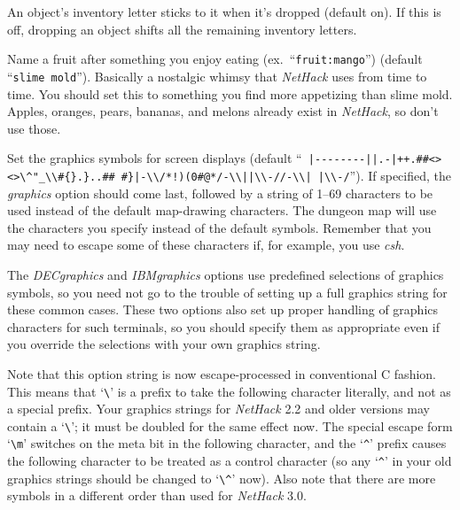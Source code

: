 \item[\ib{fixinv}]
An object's inventory letter sticks to it when it's dropped (default on).
If this is off, dropping an object shifts all the remaining inventory letters.
\item[\ib{fruit}]
Name a fruit after something you enjoy eating (ex.\ ``{\tt fruit:mango}'')
(default ``{\tt slime mold}''). Basically a nostalgic whimsy that
{\it NetHack\/} uses from time to time.  You should set this to something you
find more appetizing than slime mold.  Apples, oranges, pears, bananas, and
melons already exist in {\it NetHack}, so don't use those.
\item[\ib{graphics}]
Set the graphics symbols for screen displays (default
``\verb& |--------||.-|++.##<>&
\verb&<>\^"_\\#{}.}..## #}|-\\/*!)(0#@*/-\\||\\-//-\\| |\\-/&'').
If specified, the {\it graphics\/}
option should come last, followed by a string of 1--69
characters to be used instead of the default map-drawing characters.
The dungeon map will use the characters you specify instead of the
default symbols.
Remember that you may need to escape some of these characters
if, for example, you use {\it csh}.

The {\it DECgraphics\/} and {\it IBMgraphics\/}
options use predefined selections of graphics symbols, so you need not
go to the trouble of setting up a full graphics string for these common
cases.  These two options also set up proper handling of graphics
characters for such terminals, so you should specify them as appropriate
even if you override the selections with your own graphics string.

Note that this option string is now escape-processed in conventional C
fashion.  This means that `\verb+\+' is a prefix to take the following
character literally, and not as a special prefix.  Your graphics
strings for {\it NetHack\/} 2.2 and older versions may contain a `\verb+\+';
it must be doubled for the same effect now.  The special escape form
`\verb+\m+' switches on the meta bit in the following character, and the
`{\tt \^{}}' prefix causes the following character to be treated as a control
character (so any `{\tt \^{}}' in your old graphics strings should be changed
to `\verb+\^+' now).  Also note that there are more symbols in a different
order than used for {\it NetHack\/} 3.0.

